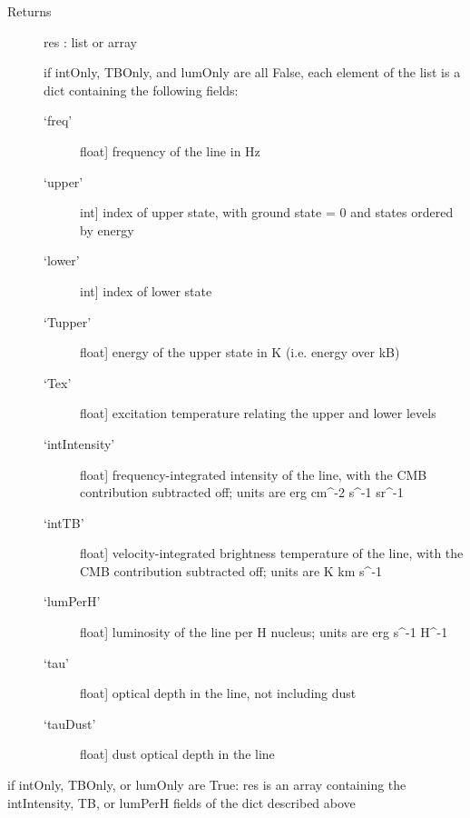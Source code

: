 \documentclass[letterpaper,10pt,english]{sphinxmanual}
\begin{document}
\begin{fulllineitems}
\begin{fulllineitems}
\begin{description}
\begin{description}
\end{description}

\item[{Returns}] \leavevmode
res : list or array

if intOnly, TBOnly, and lumOnly are all False, each element
of the list is a dict containing the following fields:
\begin{description}
\item[{`freq'}] \leavevmode{[}float{]}
frequency of the line in Hz

\item[{`upper'}] \leavevmode{[}int{]}
index of upper state, with ground state = 0 and states
ordered by energy

\item[{`lower'}] \leavevmode{[}int{]}
index of lower state

\item[{`Tupper'}] \leavevmode{[}float{]}
energy of the upper state in K (i.e. energy over kB)

\item[{`Tex'}] \leavevmode{[}float{]}
excitation temperature relating the upper and lower levels

\item[{`intIntensity'}] \leavevmode{[}float{]}
frequency-integrated intensity of the line, with the CMB
contribution subtracted off; units are erg cm\textasciicircum{}-2 s\textasciicircum{}-1 sr\textasciicircum{}-1

\item[{`intTB'}] \leavevmode{[}float{]}
velocity-integrated brightness temperature of the line,
with the CMB contribution subtracted off; units are K km
s\textasciicircum{}-1

\item[{`lumPerH'}] \leavevmode{[}float{]}
luminosity of the line per H nucleus; units are erg s\textasciicircum{}-1
H\textasciicircum{}-1

\item[{`tau'}] \leavevmode{[}float{]}
optical depth in the line, not including dust

\item[{`tauDust'}] \leavevmode{[}float{]}
dust optical depth in the line

\end{description}

\end{description}

if intOnly, TBOnly, or lumOnly are True: res is an array
containing the intIntensity, TB, or lumPerH fields of the dict
described above


\end{fulllineitems}
\end{fulllineitems}
\end{document}
